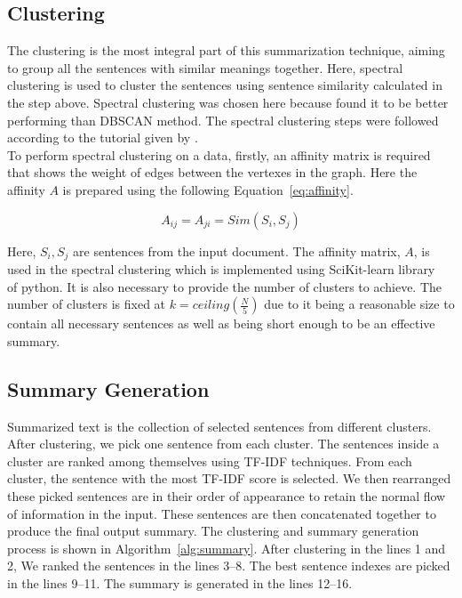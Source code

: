 \subsection{Clustering}\label{subsec:clustering}
The clustering is the most integral part of this summarization technique, aiming to group all the sentences with similar meanings together. Here, spectral clustering is used to cluster the sentences using sentence similarity calculated in the step above. Spectral clustering was chosen here because \citeauthor{roychowdhury-etal-2022-spectral-base} \cite{roychowdhury-etal-2022-spectral-base} found it to be better performing than DBSCAN method. The spectral clustering steps were followed according to the tutorial given by \cite{vonLuxburg-2007-spectral-tutorial}. \\

To perform spectral clustering on a data, firstly, an affinity matrix is required that shows the weight of edges between the vertexes in the graph. Here the affinity $A$ is prepared using the following Equation~\ref{eq:affinity}.

\begin{equation}\label{eq:affinity}
    A_{ij}=A_{ji}=Sim(S_i,S_j)
\end{equation}

Here, $S_i, S_j$ are sentences from the input document. The affinity matrix, $A$, is used in the spectral clustering which is implemented using SciKit-learn library~\cite{Pedregosa-2011-scikit-learn} of python. It is also necessary to provide the number of clusters to achieve. The number of clusters is fixed at $k=ceiling\left(\frac{N}{5}\right)$ due to it being a reasonable size to contain all necessary sentences as well as being short enough to be an effective summary.

\subsection{Summary Generation}\label{subsec:summary-generation}
Summarized text is the collection of selected sentences from different clusters. After clustering, we pick one sentence from each cluster. The sentences inside a cluster are ranked among themselves using TF-IDF techniques. From each cluster, the sentence with the most TF-IDF score is selected. We then rearranged these picked sentences are in their order of appearance to retain the normal flow of information in the input. These sentences are then concatenated together to produce the final output summary. The clustering and summary generation process is shown in Algorithm~\ref{alg:summary}. After clustering in the lines 1 and 2, We ranked the sentences in the lines 3--8. The best sentence indexes are picked in the lines 9--11. The summary is generated in the lines 12--16.

